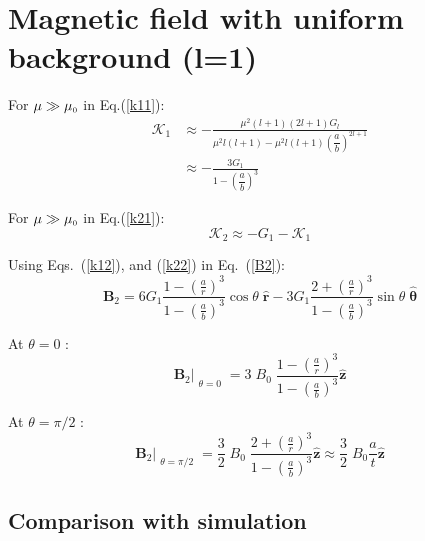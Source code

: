 \section{Magnetic field with uniform background (l=1)}

For \(\mu\gg\mu_{\scriptscriptstyle 0}\) in Eq.(\ref{k11}):
\begin{equation}\label{k12}
\begin{split}
\mathcal{K}_1 & \approx-\frac{\mu^2(l+1) (2l+1)G_l}{\mu^2 l(l+1)-\mu^2 l(l+1)\left(\dfrac{a}{b}\right)^{2l+1}}\\
& \approx-\frac{3 G_1}{1-\left(\dfrac{a}{b}\right)^{3}}
\end{split}
\end{equation}

For \(\mu\gg\mu_{\scriptscriptstyle 0}\) in Eq.(\ref{k21}):
\begin{equation}\label{k22}
\mathcal{K}_2\approx-G_1-\mathcal{K}_1
\end{equation}

Using Eqs.~(\ref{k12}), and (\ref{k22}) in Eq.~(\ref{B2}):
\begin{equation}
    \bm{B}_2=6 G_1\frac{1-\left(\frac{a}{r}\right)^3}{1-\left(\frac{a}{b}\right)^3}\cos\theta\;\bm{\hat{r}}-3 G_1\frac{2+\left(\frac{a}{r}\right)^3}{1-\left(\frac{a}{b}\right)^3}\sin\theta\;\bm{\hat{\theta}}
\end{equation}

At $\theta=0$ :
\begin{equation}
    \bm{B}_2\Bigr|_{\substack{\theta=0}}=3\;B_0\;\frac{1-\left(\frac{a}{r}\right)^3}{1-\left(\frac{a}{b}\right)^3}\bm{\hat{z}}
\end{equation}

At $\theta=\pi/2$ :
\begin{equation}
    \bm{B}_2\Bigr|_{\substack{\theta=\pi/2}}=\frac{3}{2}\;B_0\;\frac{2+\left(\frac{a}{r}\right)^3}{1-\left(\frac{a}{b}\right)^3}\bm{\hat{z}}\approx \frac{3}{2}\;B_0\frac{a}{t}\bm{\hat{z}}
\end{equation}

\subsection{Comparison with simulation}

